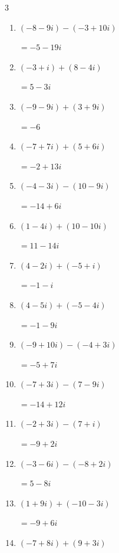 \begin{multicols}{3}
\begin{enumerate}
  \item $\displaystyle (-8-9i) - (-3+10i)$

        $\displaystyle =-5-19i$

  \item $\displaystyle (-3+i) + (8-4i)$

        $\displaystyle =5-3i$

  \item $\displaystyle (-9-9i) + (3+9i)$

        $\displaystyle =-6$

  \item $\displaystyle (-7+7i) + (5+6i)$

        $\displaystyle =-2+13i$

  \item $\displaystyle (-4-3i) - (10-9i)$

        $\displaystyle =-14+6i$

  \item $\displaystyle (1-4i) + (10-10i)$

        $\displaystyle =11-14i$

  \item $\displaystyle (4-2i) + (-5+i)$

        $\displaystyle =-1-i$

  \item $\displaystyle (4-5i) + (-5-4i)$

        $\displaystyle =-1-9i$

  \item $\displaystyle (-9+10i) - (-4+3i)$

        $\displaystyle =-5+7i$

  \item $\displaystyle (-7+3i) - (7-9i)$

        $\displaystyle =-14+12i$

  \item $\displaystyle (-2+3i) - (7+i)$

        $\displaystyle =-9+2i$

  \item $\displaystyle (-3-6i) - (-8+2i)$

        $\displaystyle =5-8i$

\columnbreak %

  \item $\displaystyle (1+9i) + (-10-3i)$

        $\displaystyle =-9+6i$

  \item $\displaystyle (-7+8i) + (9+3i)$


\end{enumerate}
\end{multicols}
